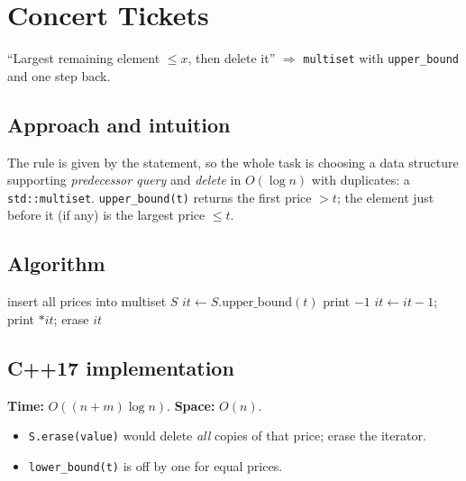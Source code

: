 \section{Concert Tickets}
\label{sec:g-concert}


\begin{patternbox}
``Largest remaining element $\le x$, then delete it'' $\Rightarrow$
\texttt{multiset} with \texttt{upper\_bound} and one step back.
\end{patternbox}

\subsection*{Approach and intuition}

The rule is given by the statement, so the whole task is choosing a data
structure supporting \emph{predecessor query} and \emph{delete} in
$O(\log n)$ with duplicates: a \texttt{std::multiset}.
\texttt{upper\_bound(t)} returns the first price $>t$; the element just
before it (if any) is the largest price $\le t$.

\subsection*{Algorithm}
\begin{algorithmic}[1]
\State insert all prices into multiset $S$
  \State $it\gets S.\text{upper\_bound}(t)$
   \State print $-1$
  \Else \State $it\gets it-1$; print $*it$; erase $it$ \EndIf
\EndFor
\end{algorithmic}


\subsection*{C++17 implementation}

\begin{complexitybox}
\textbf{Time:} $O((n+m)\log n)$. \textbf{Space:} $O(n)$.
\end{complexitybox}

\begin{pitfallbox}
\begin{itemize}
  \item \texttt{S.erase(value)} would delete \emph{all} copies of that
        price; erase the iterator.
  \item \texttt{lower\_bound(t)} is off by one for equal prices.
\end{itemize}
\end{pitfallbox}
